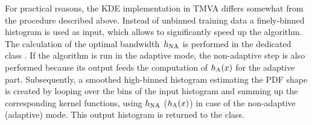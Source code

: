 For practical reasons, the KDE implementation in TMVA differs somewhat from the procedure 
described above. Instead of unbinned training data a finely-binned histogram is used as 
input, which allows to significantly speed up the algorithm. The calculation of the optimal
bandwidth~$h_{\rm NA}$ is performed in the dedicated class . If the algorithm 
is run in the adaptive mode, the non-adaptive step is also performed because its output feeds
the computation of $h_{\rm A}(x)$ for the adaptive part. Subsequently, a smoothed high-binned 
histogram estimating the PDF shape is created by looping over the bins of the input histogram 
and summing up the corresponding kernel functions, using $h_{\rm NA}$ ($h_{\rm A}(x)$) in 
case of the non-adaptive (adaptive) mode. This output histogram is returned to the 
class.

